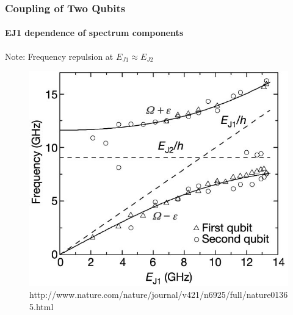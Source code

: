 \documentclass{beamer}
\begin{document}

\begin{frame}
    \frametitle{Coupling of Two Qubits}
    \framesubtitle{EJ1 dependence of spectrum components}
    \begin{block}{}
        \centering
        Note: Frequency repulsion at $E_{J1} \approx E_{J2}$
    \end{block}
    \begin{figure}[ht!]
        \centering
        \includegraphics[height=0.6\textheight]{img/freq-vs-ej1.jpg}
        \caption{http://www.nature.com/nature/journal/v421/n6925/full/nature01365.html}
    \end{figure}
\end{frame}

\end{document}

